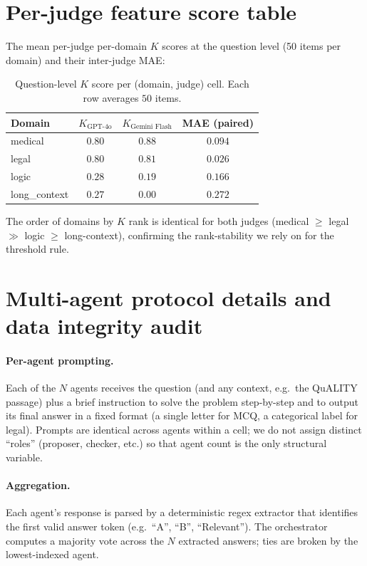 \documentclass{article}
\begin{document}
\section{Per-judge feature score table}
\label{app:per-judge-features}

The mean per-judge per-domain $K$ scores at the question level (50 items per domain) and
their inter-judge MAE:

\begin{table}[h]
\centering
\caption{Question-level $K$ score per (domain, judge) cell. Each row averages $50$ items.}
\label{tab:qk-perjudge}
\begin{tabular}{lcc c}
\toprule
\textbf{Domain} & \textbf{$K_{\text{GPT-4o}}$} & \textbf{$K_{\text{Gemini Flash}}$} & \textbf{MAE (paired)} \\
\midrule
medical       & $0.80$ & $0.88$ & $0.094$ \\
legal         & $0.80$ & $0.81$ & $0.026$ \\
logic         & $0.28$ & $0.19$ & $0.166$ \\
long\_context & $0.27$ & $0.00$ & $0.272$ \\
\bottomrule
\end{tabular}
\end{table}

The order of domains by $K$ rank is identical for both judges (medical $\geq$ legal $\gg$ logic $\geq$ long-context), confirming the rank-stability we rely on for the threshold rule.


\section{Multi-agent protocol details and data integrity audit}
\label{app:protocol-detail}

\paragraph{Per-agent prompting.} Each of the $N$ agents receives the question (and any context, e.g.\ the QuALITY passage) plus a brief instruction to solve the problem step-by-step and to output its final answer in a fixed format (a single letter for MCQ, a categorical label for legal). Prompts are identical across agents within a cell; we do not assign distinct ``roles'' (proposer, checker, etc.) so that agent count is the only structural variable.

\paragraph{Aggregation.} Each agent's response is parsed by a deterministic regex extractor that identifies the first valid answer token (e.g.\ ``A'', ``B'', ``Relevant''). The orchestrator computes a majority vote across the $N$ extracted answers; ties are broken by the lowest-indexed agent.
\end{document}
